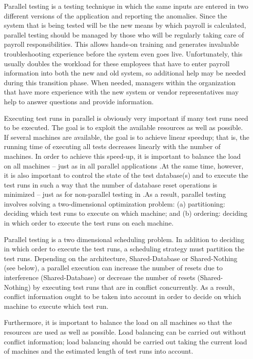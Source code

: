 Parallel testing is a testing technique in which the same inputs are entered in two different versions of the application and reporting the anomalies. Since the system that is being tested will be the new means by which payroll is calculated, parallel testing should be managed by those who will be regularly taking care of payroll responsibilities. This allows hands-on training and generates invaluable troubleshooting experience before the system even goes live. Unfortunately, this usually doubles the workload for these employees that have to enter payroll information into both the new and old system, so additional help may be needed during this transition phase. When needed, managers within the organization that have more experience with the new system or vendor representatives may help to answer questions and provide information.

Executing test runs in parallel is obviously very important if many test runs need to be executed. The goal is to exploit the available resources as well as possible. If several machines are available, the goal is to achieve linear speedup; that is, the running time of executing all tests decreases linearly with the number of machines. In order to achieve this speed-up, it is important to balance the load on all machines – just as in all parallel applications .At the same time, however, it is also important to control the state of the test database(s) and to execute the test runs in such a way that the number of database reset operations is minimized – just as for non-parallel testing in .As a result, parallel testing involves solving a two-dimensional optimization problem: (a) partitioning: deciding which test runs to execute on which machine; and (b) ordering: deciding in which order to execute the test runs on each machine.

Parallel testing is a two dimensional scheduling problem. In addition to deciding in which order to execute the test runs, a scheduling strategy must partition the test runs. Depending on the architecture, Shared-Database or Shared-Nothing (see below), a parallel execution can increase the number of resets due to interference (Shared-Database) or decrease the number of resets (Shared-Nothing) by executing test runs that are in conflict concurrently. As a result, conflict information ought to be taken into account in order to decide on which machine to execute which test run. 

Furthermore, it is important to balance the load on all machines so that the resources are used as well as possible. Load balancing can be carried out without conflict information; load balancing should be carried out taking the current load of machines and the estimated length of test runs into account.